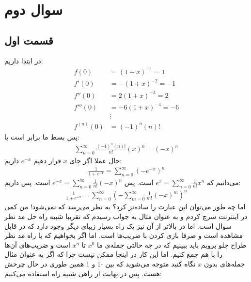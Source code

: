 \documentclass[]{article}
\begin{document}
\section*{سوال دوم}
\subsection*{قسمت اول}
در ابتدا داریم:
\begin{align*}
    f(0) &= (1 + x)^{-1} = 1\\
    f'(0) &= -(1 + x)^{-2} = -1\\
    f''(0) &= 2(1 + x)^{-3} = 2\\
    f'''(0) &= -6(1 + x)^{-4} = -6\\
    &\vdots\\
    f^{(n)}(0) &= (-1)^{n} (n)!
\end{align*}
پس بسط ما برابر است با:
\begin{gather*}
    \sum_{n=0}^{\infty} \frac{(-1)^{n} (n)!}{n!}(x)^n = (-x)^n
\end{gather*}
حال عملا اگر جای
$x$ قرار دهیم $e^{-x}$
داریم:
\begin{gather*}
    \frac{1}{1+e^{-x}} = \boxed{\sum_{n=0}^{\infty} (-e^{-x})^n}
\end{gather*}
می‌دانیم که
$e^x = \sum_{n=0}^{\infty} \frac{1}{n!}x^n$
است. پس
$e^{-x} = \sum_{n=0}^{\infty} \frac{1}{n!}(-x)^n$
است. پس داریم:
\begin{gather*}
    \frac{1}{1+e^{-x}} = \sum_{n=0}^{\infty} (- \sum_{m=0}^{\infty} \frac{1}{m!}(-x)^m)^n
\end{gather*}
اما چه طور می‌توان این عبارت را ساده‌تر کرد؟ به نظر می‌رسد که نمی‌شود! من کمی در اینترنت سرچ کردم
و به عنوان مثال به
جواب رسیدم که تقریبا شبیه راه حل مد نظر سوال است. اما در بالاتر از آن نیز یک راه بسیار زیبای دیگر وجود
دارد که در
قابل مشاهده است و صرفا بازی کردن با ضریب‌ها است. اما اگر بخواهیم که با راه مد نظر طراح جلو برویم
باید ببینیم که در چه حالتی جمله‌ی ما
$x^0$
تا
$x^n$
است و ضریب‌های آن‌ها را با هم جمع کنیم. اما این کار در اینجا ممکن نیست چرا که اگر به عنوان مثال
جمله‌های بدون
$x$
نگاه کنید متوجه می‌شوید که بین -1 و 1 همین طوری در حال چرخش هست. پس در نهایت از راهی شبیه راه
استفاده می‌کنیم:
\end{document}

